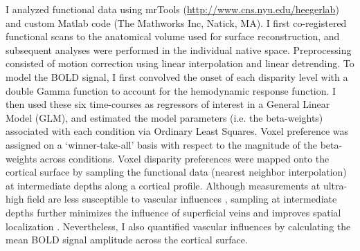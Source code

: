 I analyzed functional data using mrTools (\url{http://www.cns.nyu.edu/heegerlab}) and custom Matlab code (The Mathworks Inc, Natick, MA). I first co-registered functional scans to the anatomical volume used for surface reconstruction, and subsequent analyses were performed in the individual native space. Preprocessing consisted of motion correction using linear interpolation and linear detrending. To model the BOLD signal, I first convolved the onset of each disparity level with a double Gamma function to account for the hemodynamic response function. I then used these six time-courses as regressors of interest in a General Linear Model (GLM), and estimated the model parameters (i.e. the beta-weights) associated with each condition via Ordinary Least Squares. Voxel preference was assigned on a `winner-take-all' basis with respect to the magnitude of the beta-weights across conditions. Voxel disparity preferences were mapped onto the cortical surface by sampling the functional data (nearest neighbor interpolation) at intermediate depths along a cortical profile. Although measurements at ultra-high field are less susceptible to vascular influences \cite{Gati:1997uq,Ogawa:1998fk,Ugurbil:2003uq}, sampling at intermediate depths further minimizes the influence of superficial veins \cite{SanchezPanchuelo:2012jq} and improves spatial localization \cite{Polimeni:2010fl}. Nevertheless, I also quantified vascular influences by calculating the mean BOLD signal amplitude across the cortical surface.

